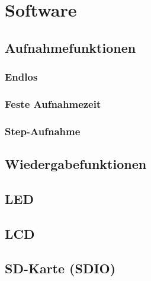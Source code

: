 
\newpage
\section{Software}




\subsection{Aufnahmefunktionen}
\subsubsection{Endlos}
\subsubsection{Feste Aufnahmezeit}
\subsubsection{Step-Aufnahme}
\subsection{Wiedergabefunktionen}
\subsection{LED}
\subsection{LCD}
\subsection{SD-Karte (SDIO)}

